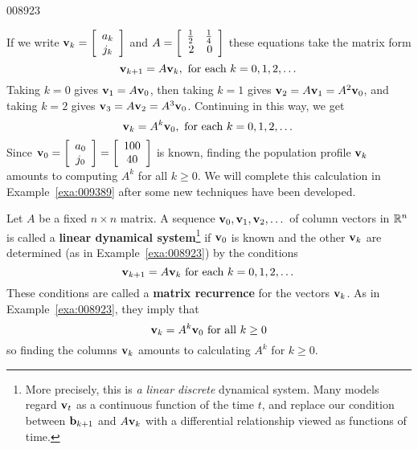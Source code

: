 \begin{example}{}{008923}
\begin{solution}
If we write $\textbf{v}_k = \left[ \begin{array}{c}
a_k \\
j_k 
\end{array}\right]$
 and $A = \left[ \begin{array}{rr}
\tfrac{1}{2} & \tfrac{1}{4} \\
2 & 0 \end{array}\right]$
 these equations take the matrix form
\begin{equation*}
\textbf{v}_{k+1} = A\textbf{v}_k, \mbox{ for each } k = 0,1,2,\dots
\end{equation*}
Taking $k = 0$ gives $\textbf{v}_{1} = A\textbf{v}_{0}$, then taking $k = 1$ gives $\textbf{v}_{2} = A\textbf{v}_{1} = A^{2}\textbf{v}_{0}$, and taking $k = 2$ gives $\textbf{v}_{3} = A\textbf{v}_{2} = A^{3}\textbf{v}_{0}$. Continuing in this way, we get
\begin{equation*}
\textbf{v}_k = A^k \textbf{v}_0, \mbox{ for each } k=0,1,2, \dots
\end{equation*}
Since $\textbf{v}_0 = \left[ \begin{array}{c}
a_0 \\
j_0 
\end{array}\right] = \left[ \begin{array}{c}
100 \\
40 
\end{array}\right] $
 is known, finding the population profile $\textbf{v}_{k}$ amounts to computing $A^{k}$ for all $k \geq 0$. We will complete this calculation in Example~\ref{exa:009389} after some new techniques have been developed.
\end{solution}
\end{example}

Let $A$ be a fixed $n \times n$ matrix. A sequence $\textbf{v}_{0}, \textbf{v}_{1}, \textbf{v}_{2}, \dots$  of column vectors in $\mathbb{R}^n$ is called a \textbf{linear dynamical system}\footnote{More precisely, this is \textit{a linear discrete} dynamical system. Many models regard $\textbf{v}_{t}$ as a continuous function of the time $t$, and replace our condition between $\textbf{b}_{k+1}$ and $A\textbf{v}_k$ with a differential relationship viewed as functions of time.}
 if $\textbf{v}_{0}$ is known and the other $\textbf{v}_{k}$ are determined (as in Example~\ref{exa:008923}) by the conditions
\begin{equation*}
\textbf{v}_{k+1} = A\textbf{v}_k \mbox{ for each } k = 0, 1, 2, \dots
\end{equation*}
These conditions are called a \textbf{matrix recurrence} for the vectors $\textbf{v}_{k}$. As in Example~\ref{exa:008923}, they imply that
\begin{equation*}
\textbf{v}_k = A^k \textbf{v}_0 \mbox{ for all }k \ge 0
\end{equation*}
so finding the columns $\textbf{v}_{k}$ amounts to calculating $A^{k}$ for $k \geq 0$.



